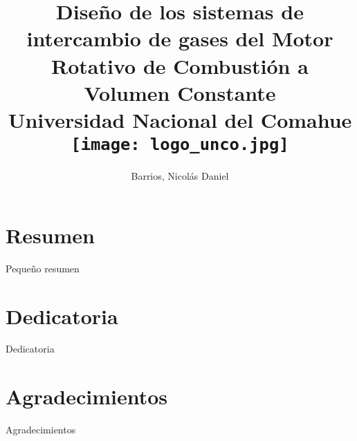 \documentclass[11pt,openright,twoside]{report}
\begin{document}
\title{
    {Diseño de los sistemas de intercambio de gases del Motor Rotativo de
    Combustión a Volumen Constante
    }\\

{\large Universidad Nacional del Comahue}\\
{\texttt{[image: logo\_unco.jpg]}}
}
\author{Barrios, Nicolás Daniel}
\date{}\maketitle

\chapter*{Resumen}
Pequeño resumen

\chapter*{Dedicatoria}
Dedicatoria

\chapter*{Agradecimientos}
Agradecimientos

\tableofcontents









\printbibliography
\end{document}
